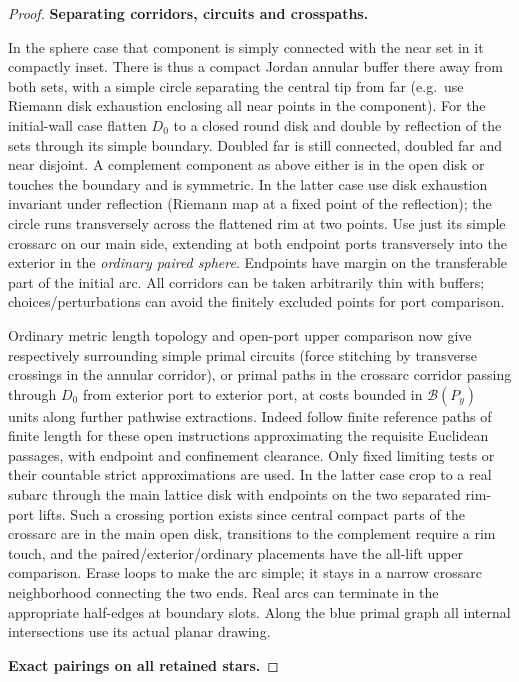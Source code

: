 \begin{proof}
\smallskip
\noindent\textbf{Separating corridors, circuits and crosspaths.}\quad

In the sphere case that component is simply connected with the near set in it compactly
inset. There is thus a compact Jordan annular buffer there away from both sets, with a
simple circle separating the central tip from far (e.g.~use Riemann disk exhaustion
enclosing all near points in the component). For the initial-wall case flatten \(D_0\) to
a closed round disk and double by reflection of the sets through its simple boundary.
Doubled far is still connected, doubled far and near disjoint. A complement component as
above either is in the open disk or touches the boundary and is symmetric. In the latter
case use disk exhaustion invariant under reflection (Riemann map at a fixed point of the
reflection); the circle runs transversely across the flattened rim at two points. Use just
its simple crossarc on our main side, extending at both endpoint ports transversely into
the exterior in the \emph{ordinary paired sphere}. Endpoints have margin on the
transferable part of the initial arc. All corridors can be taken arbitrarily thin with
buffers; choices/perturbations can avoid the finitely excluded points for port comparison.

Ordinary metric length topology and open-port upper comparison now give respectively
surrounding simple primal circuits (force stitching by transverse crossings in the annular
corridor), or primal paths in the crossarc corridor passing through \(D_0\) from exterior
port to exterior port, at costs bounded in \(\mathcal B(P_y)\) units along further
pathwise extractions. Indeed follow finite reference paths of finite length for these open
instructions approximating the requisite Euclidean passages, with endpoint and confinement
clearance. Only fixed limiting tests or their countable strict approximations are used. In
the latter case crop to a real subarc through the main lattice disk with endpoints on the
two separated rim-port lifts. Such a crossing portion exists since central compact parts
of the crossarc are in the main open disk, transitions to the complement require a rim
touch, and the paired/exterior/ordinary placements have the all-lift upper comparison.
Erase loops to make the arc simple; it stays in a narrow crossarc neighborhood connecting
the two ends. Real arcs can terminate in the appropriate half-edges at boundary slots.
Along the blue primal graph all internal intersections use its actual planar drawing.

\smallskip
\noindent\textbf{Exact pairings on all retained stars.}\quad


\end{proof}
